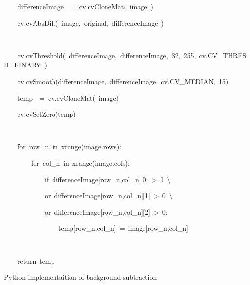 \documentclass[english]{IEEEtran}
\theoremstyle{plain}
\newenvironment{lyxcode}
{\par\begin{list}{}{
\setlength{\rightmargin}{\leftmargin}
\setlength{\listparindent}{0pt}%
\raggedright
\setlength{\itemsep}{0pt}
\setlength{\parsep}{0pt}
\normalfont\ttfamily}%
 \item[]}
{\end{list}}
\begin{document}
%
\begin{algorithm*}
\begin{lyxcode}


~~~~differenceImage~~=~cv.cvCloneMat(~image~)

~~~~cv.cvAbsDiff(~image,~original,~differenceImage~)

~~~~

~~~~cv.cvThreshold(~differenceImage,~differenceImage,~32,~255,~cv.CV\_THRESH\_BINARY~)

~~~~cv.cvSmooth(differenceImage,~differenceImage,~cv.CV\_MEDIAN,~15)



~~~~temp~~=~cv.cvCloneMat(~image)

~~~~cv.cvSetZero(temp)

~~~~

~~~~for~row\_n~in~xrange(image.rows):

~~~~~~~~for~col\_n~in~xrange(image.cols):

~~~~~~~~~~~~if~differenceImage{[}row\_n,col\_n{]}{[}0{]}~>~0~\textbackslash{}

~~~~~~~~~~~~or~differenceImage{[}row\_n,col\_n{]}{[}1{]}~>~0~\textbackslash{}

~~~~~~~~~~~~or~differenceImage{[}row\_n,col\_n{]}{[}2{]}~>~0:

~~~~~~~~~~~~~~~~temp{[}row\_n,col\_n{]}~=~image{[}row\_n,col\_n{]}

~~~~

~~~~return~temp


\end{lyxcode}
\caption{\label{alg:back-Python-imple}Python implementaition of background
subtraction}

\end{algorithm*}
\end{document}
